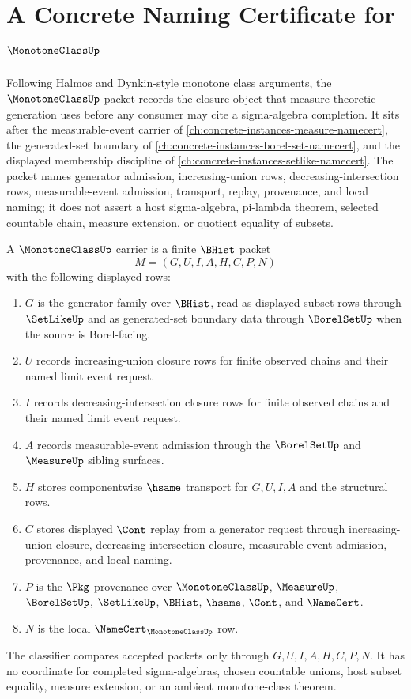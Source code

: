 \chapter{A Concrete Naming Certificate for $\MonotoneClassUp$}
\label{ch:concrete-instances-monotone-class-namecert}

Following Halmos and Dynkin-style monotone class arguments, the $\MonotoneClassUp$ packet records the closure object that measure-theoretic generation uses before any consumer may cite a sigma-algebra completion. It sits after the measurable-event carrier of \autoref{ch:concrete-instances-measure-namecert}, the generated-set boundary of \autoref{ch:concrete-instances-borel-set-namecert}, and the displayed membership discipline of \autoref{ch:concrete-instances-setlike-namecert}. The packet names generator admission, increasing-union rows, decreasing-intersection rows, measurable-event admission, transport, replay, provenance, and local naming; it does not assert a host sigma-algebra, pi-lambda theorem, selected countable chain, measure extension, or quotient equality of subsets.

\begin{definition}
\label{def:monotone-class-carrier}
A $\MonotoneClassUp$ carrier is a finite $\BHist$ packet
$$
M=(G,U,I,A,H,C,P,N)
$$
with the following displayed rows:
\begin{enumerate}
\item $G$ is the generator family over $\BHist$, read as displayed subset rows through $\SetLikeUp$ and as generated-set boundary data through $\BorelSetUp$ when the source is Borel-facing.
\item $U$ records increasing-union closure rows for finite observed chains and their named limit event request.
\item $I$ records decreasing-intersection closure rows for finite observed chains and their named limit event request.
\item $A$ records measurable-event admission through the $\BorelSetUp$ and $\MeasureUp$ sibling surfaces.
\item $H$ stores componentwise $\hsame$ transport for $G,U,I,A$ and the structural rows.
\item $C$ stores displayed $\Cont$ replay from a generator request through increasing-union closure, decreasing-intersection closure, measurable-event admission, provenance, and local naming.
\item $P$ is the $\Pkg$ provenance over $\MonotoneClassUp$, $\MeasureUp$, $\BorelSetUp$, $\SetLikeUp$, $\BHist$, $\hsame$, $\Cont$, and $\NameCert$.
\item $N$ is the local $\NameCert_{\MonotoneClassUp}$ row.
\end{enumerate}
The classifier compares accepted packets only through $G,U,I,A,H,C,P,N$. It has no coordinate for completed sigma-algebras, chosen countable unions, host subset equality, measure extension, or an ambient monotone-class theorem.
\end{definition}


